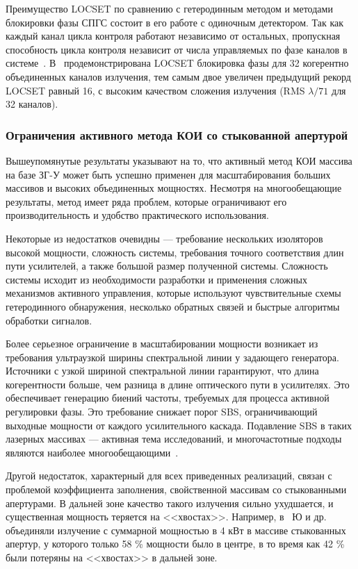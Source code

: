 Преимущество LOCSET по сравнению с гетеродинным методом и методами блокировки фазы СПГС состоит в его работе с одиночным детектором. Так как каждый канал цикла контроля работают независимо от остальных, пропускная способность цикла контроля независит от числа управляемых по фазе каналов в системе~\cite{Locset33}. В~\cite{Locset_pulford} продемонстрирована LOCSET блокировка фазы для 32 когерентно объединенных каналов излучения, тем самым двое увеличен предыдущий рекорд LOCSET равный 16, с высоким качеством сложения излучения (RMS $\lambda/71$ для 32 каналов).

\subsubsection{Ограничения активного метода КОИ со стыкованной апертурой}

Вышеупомянутые результаты указывают на то, что активный метод КОИ массива на базе ЗГ-У может быть успешно применен для масштабирования больших массивов и высоких объединенных мощностях. Несмотря на многообещающие результаты, метод имеет ряда проблем, которые ограничивают его производительность и удобство практического использования.

Некоторые из недостатков очевидны --- требование нескольких изоляторов высокой мощности, сложность системы, требования точного соответствия длин пути усилителей, а также большой размер полученной системы. Сложность системы исходит из необходимости разработки и применения сложных механизмов активного управления, которые используют чувствительные схемы гетеродинного обнаружения, несколько обратных связей и быстрые алгоритмы обработки сигналов.

Более серьезное ограничение в масштабировании мощности возникает из требования ультраузкой ширины спектральной линии у задающего генератора. Источники с узкой шириной спектральной линии гарантируют, что длина когерентности больше, чем разница в длине оптического пути в усилителях. Это обеспечивает генерацию биений частоты, требуемых для процесса активной регулировки фазы. Это требование снижает порог SBS, ограничивающий выходные мощности от каждого усилительного каскада. Подавление SBS в таких лазерных массивах --- активная тема исследований, и многочастотные подходы являются наиболее многообещающими~\cite{Jain118, Jain124}.

Другой недостаток, характерный для всех приведенных реализаций, связан с проблемой коэффициента заполнения, свойственной массивам со стыкованными апертурами. В дальней зоне качество такого излучения сильно ухудшается, и существенная мощность теряется на <<хвостах>>. Например, в~\cite{Jain117} Ю и др. объединяли излучение с суммарной мощностью в 4 кВт в массиве стыкованных апертур, у которого только 58 \% мощности было в центре, в то время как 42 \% были потеряны на <<хвостах>> в дальней зоне.

